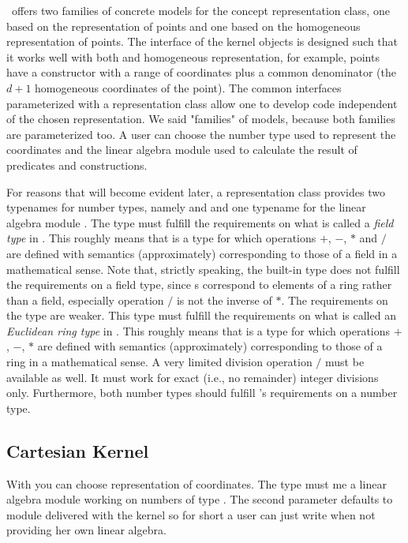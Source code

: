 \cgal\ offers two families of concrete models for the concept
representation class, one based on the 
representation of points and one based on the homogeneous
representation of points.  The interface of the kernel objects is
designed such that it works well with both
 and homogeneous representation, for
example, points have a constructor with a range of coordinates plus a
common denominator (the $d+1$ homogeneous coordinates of the point).
The common interfaces parameterized with a representation class allow
one to develop code independent of the chosen representation.  We said
"families" of models, because both families are parameterized too.
A user can choose the number type used to represent the coordinates
and the linear algebra module used to calculate the result of
predicates and constructions.

For reasons that will become evident later, a representation class
provides two typenames for number types,
namely  and  and one typename for the linear
algebra module .
The type  must fulfill the
requirements on what is called a {\em field type} in \cgal. This
roughly means that  is a type for which operations $+$,
$-$, $*$ and $/$ are defined with semantics (approximately)
corresponding to those of a field in a mathematical sense. Note that,
strictly speaking, the built-in type  does not fulfill the
requirements on a field type, since s correspond to elements
of a ring rather than a field, especially operation $/$ is not the
inverse of $*$.  The requirements on the type  are
weaker.  This type must fulfill the requirements on what is called an
{\em Euclidean ring type} in \cgal. This roughly means that
 is a type for which operations $+$, $-$, $*$ are
defined with semantics (approximately) corresponding to those of a
ring in a mathematical sense.  A very limited division operation $/$
must be available as well.  It must work for exact (i.e., no
remainder) integer divisions only.  Furthermore, both number types
should fulfill \cgal's requirements on a number type.  

\subsection{Cartesian Kernel}
With  you can choose
 representation of coordinates. The type
 must me a linear algebra module working on numbers
of type . The second parameter defaults to module
delivered with the kernel so for short a user can just write
 when not providing her own linear
algebra.

